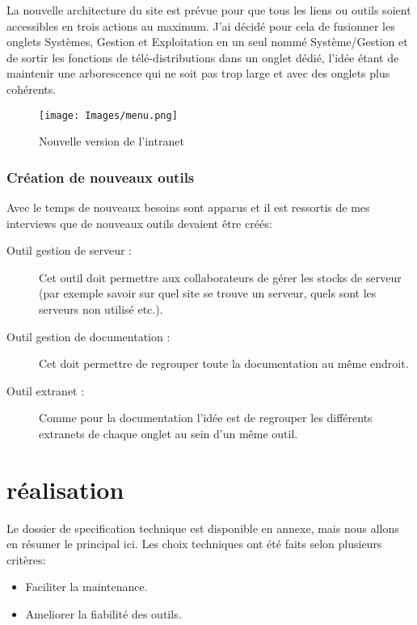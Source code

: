 La nouvelle architecture du site est prévue pour que tous les liens ou
outils soient accessibles en trois actions au maximum. J'ai décidé
pour cela de fusionner les onglets Systèmes, Gestion et Exploitation
en un seul nommé Système/Gestion et de sortir les fonctions de
télé-distributions dans un onglet dédié, l'idée étant de maintenir une
arborescence qui ne soit pas trop large et avec des onglets plus
cohérents.


\begin{figure}[h]
\begin{center}
\texttt{[image: Images/menu.png]}
\caption{Nouvelle version de l'intranet}
\label{Nouvelle version de l'intranet}
\end{center}
\end{figure}


\subsection*{Création de nouveaux outils}

Avec le temps de nouveaux besoins sont apparus et il est ressortis de mes interviews
que de nouveaux outils devaient être créés:
\begin{description}
\item[Outil gestion de serveur :] Cet outil doit permettre aux
  collaborateurs de gérer les stocks de serveur (par exemple savoir
  sur quel site se trouve un serveur, quels sont les serveurs non
  utilisé etc.).
\item[Outil gestion de documentation :] Cet doit permettre de
  regrouper toute la documentation au même endroit.
\item[Outil extranet :] Comme pour la documentation l'idée est de
  regrouper les différents extranets de chaque onglet au sein d'un même outil.
\end{description}



\chapter{réalisation}

Le dossier de specification technique est disponible en annexe, mais
nous allons en résumer le principal ici.  Les choix techniques ont été
faits selon plusieurs critères:

\begin{itemize}
\item Faciliter la maintenance.
\item Ameliorer la fiabilité des outils.
\end{itemize}

